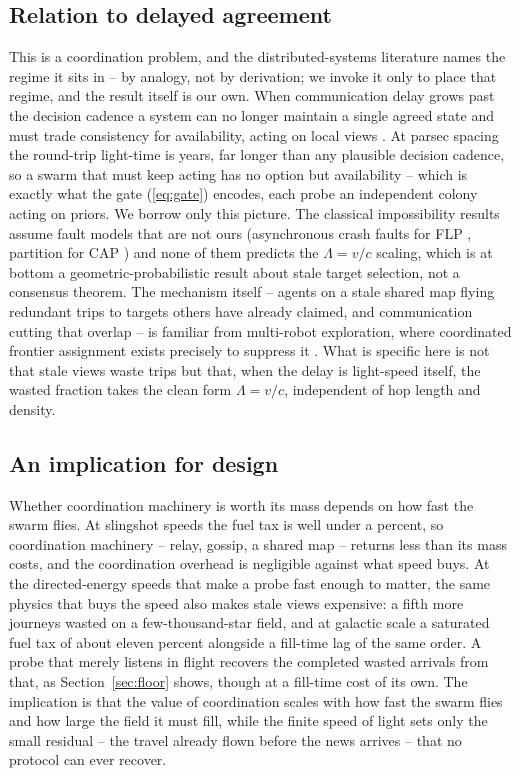 \subsection{Relation to delayed agreement}
This is a coordination problem, and the distributed-systems literature names the regime it sits in --
by analogy, not by derivation; we invoke it only to place that regime, and the result itself is our
own. When communication delay grows past the decision cadence a system can no longer maintain a single
agreed state and must trade consistency for availability, acting on local views
\citep{gilbert-lynch-2002,olfati-saber-fax-murray-2007}. At parsec spacing the round-trip light-time
is years, far longer than any plausible decision cadence, so a swarm that must keep acting has no
option but availability -- which is exactly what the gate (\ref{eq:gate}) encodes, each probe an
independent colony acting on priors. We borrow only this picture. The classical impossibility results
assume fault models that are not ours (asynchronous crash faults for FLP \citep{flp-1985}, partition
for CAP \citep{gilbert-lynch-2002}) and none of them predicts the $\Lambda = v/c$ scaling, which is at
bottom a geometric-probabilistic result about stale target selection, not a consensus theorem. The
mechanism itself -- agents on a stale shared map flying redundant trips to targets others have already
claimed, and communication cutting that overlap -- is familiar from multi-robot exploration, where
coordinated frontier assignment exists precisely to suppress it \citep{burgard-2005,amigoni-2017}.
What is specific here is not that stale views waste trips but that, when the delay is light-speed
itself, the wasted fraction takes the clean form $\Lambda = v/c$, independent of hop length and
density.

\subsection{An implication for design}
Whether coordination machinery is worth its mass depends on how fast the swarm flies. At
slingshot speeds the fuel tax is well under a
percent, so coordination machinery -- relay, gossip, a shared map -- returns less than its mass
costs, and the coordination overhead is negligible against what speed buys. At the directed-energy
speeds that make a probe fast enough to matter, the same physics that buys the speed also makes stale
views expensive: a fifth more journeys wasted on a few-thousand-star field, and at galactic scale a
saturated fuel tax of about eleven percent alongside a fill-time lag of the same order. A probe that
merely listens in flight recovers the completed wasted arrivals from that, as
Section~\ref{sec:floor} shows, though at a fill-time cost of its own. The implication is that the value of coordination
scales with how fast the swarm flies and how large the field it must fill, while the finite speed of
light sets only the small residual -- the travel already flown before the news arrives -- that no
protocol can ever recover.
